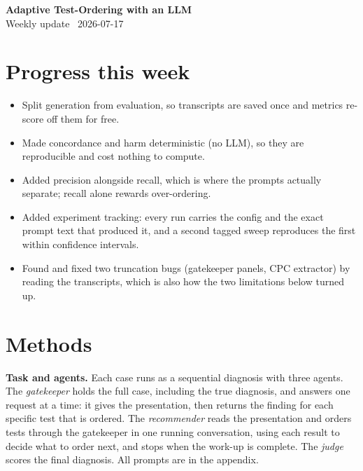 \documentclass[11pt]{article}
\begin{document}
\pagestyle{empty}

{\LARGE\bfseries Adaptive Test-Ordering with an LLM}\\[4pt]
{\color{muted} Weekly update \textbullet\ 2026-07-17}

\medskip
\noindent{}

\section{Progress this week}
\begin{itemize}
\item Split generation from evaluation, so transcripts are saved once and metrics re-score off them for free.
\item Made concordance and harm deterministic (no LLM), so they are reproducible and cost nothing to compute.
\item Added precision alongside recall, which is where the prompts actually separate; recall alone rewards over-ordering.
\item Added experiment tracking: every run carries the config and the exact prompt text that produced it, and a second tagged sweep reproduces the first within confidence intervals.
\item Found and fixed two truncation bugs (gatekeeper panels, CPC extractor) by reading the transcripts, which is also how the two limitations below turned up.
\end{itemize}

\section{Methods}

\textbf{Task and agents.} Each case runs as a sequential diagnosis with three agents. The \emph{gatekeeper} holds the full case, including the true diagnosis, and answers one request at a time: it gives the presentation, then returns the finding for each specific test that is ordered. The \emph{recommender} reads the presentation and orders tests through the gatekeeper in one running conversation, using each result to decide what to order next, and stops when the work-up is complete. The \emph{judge} scores the final diagnosis. All prompts are in the appendix.
\end{document}

